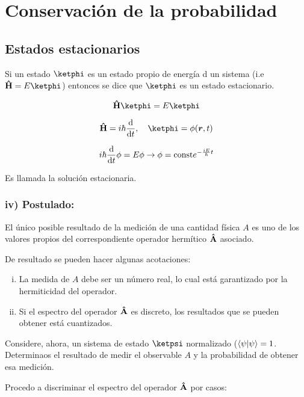 \section{Conservación de la probabilidad}
\subsection{Estados estacionarios}

\begin{definition}
    Si un estado $\ketphi$ es un estado propio de energía d un sistema (i.e $\vu{H}=E\ketphi$) entonces se dice que $\ketphi$ es un estado estacionario.
\end{definition}

$$
    \vu{H}\ketphi=E\ketphi
$$

$$
  \vu{H}=i\hbar\dv{t}  \qc\ketphi=\phi(\vb*{r},t)
$$

$$
    i\hbar\dv{t}\phi=E\phi\rightarrow\phi=\text{const}e^{-\frac{iE}{\hbar}t}
$$

Es llamada la solución estacionaria.

\subsubsection{iv) Postulado:}
El único posible resultado de la medición de una cantidad física $A$ es uno de los valores propios del correspondiente operador hermítico $\vu{A}$ asociado.

De resultado se pueden hacer algunas acotaciones:
\begin{enumerate}[i)]
    \item La medida de $A$ debe ser un número real, lo cual está garantizado por la hermiticidad del operador.
    \item Si el espectro del operador $\vu{A}$ es discreto, los resultados que se pueden obtener está cuantizados. 
\end{enumerate}

Considere, ahora, un sistema de estado $\ketpsi$ normalizado ($\braket{\psi}=1$. Determinaos el resultado de medir el observable $A$ y la probabilidad de obtener esa medición.

Procedo a discriminar el espectro del operador $\vu{A}$ por casos:

